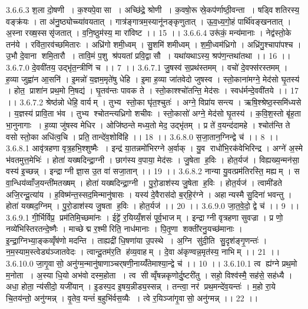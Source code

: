 3.6.6.3
श॒ला दो॒षणी । क॒श्यपे॒वासा । अच्छि॑द्रे॒ श्रोणी । क॒वषो॒रू स्रे॒कप॑र्णाष्ठी॒वन्ता । षड्वि॑शतिरस्य॒ वङ्क्र॑यः । ता अ॑नु॒ष्ठ्योच्च्या॑वयतात् । गात्र॑ङ्गात्रम॒स्यानू॑नङ्कृणुतात् । ऊ॒व॒ध्य॒गो॒हं पार्थि॑वङ्खनतात् । अ॒स्ना रख्ष॒स्ससृ॑जतात् । व॒नि॒ष्ठुम॑स्य॒ मा रा॑विष्ट ।। 15 ।।
3.6.6.4
उरू॑कं॒ मन्य॑मानाः । नेद्व॑स्तो॒के तन॑ये । रवि॑ता॒रव॑च्छमितारः । अध्रि॑गो शमी॒ध्वम् । सु॒शमि॑ शमीध्वम् । श॒मी॒ध्वम॑ध्रिगो । अध्रि॑गु॒श्चापा॑पश्च । उ॒भौ दे॒वाना॑ शमि॒तारौ । तावि॒मं प॒शु श्र॑पयतां प्रवि॒द्वासौ । यथा॑यथाऽस्य॒ श्रप॑ण॒न्तथा॑तथा ।। 16 ।।
3.6.7.0
दे॒ववी॑तय॒ उद्भृ॑त॒न्त्रीणि॑ च ।। 7 ।।
3.6.7.1
जु॒षस्व॑ स॒प्रथ॑स्तमम् । वचो॑ दे॒वफ्स॑रस्तमम् । ह॒व्या जुह्वा॑न आ॒सनि॑ । इ॒मन्नो॑ य॒ज्ञम॒मृते॑षु धेहि । इ॒मा ह॒व्या जा॑तवेदो जुषस्व । स्तो॒काना॑मग्ने॒ मेद॑सो घृ॒तस्य॑ । होत॒ प्राशा॑न प्रथ॒मो नि॒षद्य॑ । घृ॒तव॑न्तः पावक ते । स्तो॒काश्श्चो॑तन्ति॒ मेद॑सः । स्वध॑र्मन्दे॒ववी॑तये ।। 17 ।।
3.6.7.2
श्रेष्ठ॑न्नो धेहि॒ वार्यम् । तुभ्य॑ स्तो॒का घृ॑त॒श्चुतः॑ । अग्ने॒ विप्रा॑य सन्त्य । ऋषि॒श्श्रेष्ठ॒स्समि॑ध्यसे । य॒ज्ञस्य॑ प्रावि॒ता भ॑व । तुभ्य॑ श्चोतन्त्यध्रिगो शचीवः । स्तो॒कासो॑ अग्ने॒ मेद॑सो घृ॒तस्य॑ । क॒वि॒श॒स्तो बृ॑ह॒ता भा॒नुनागाः । ह॒व्या जु॑षस्व मेधिर । ओजि॑ष्ठन्ते मध्य॒तो मेद॒ उद्भृ॑तम् । प्र ते॑ व॒यन्द॑दामहे । श्चोत॑न्ति ते वसो स्तो॒का अधि॑त्व॒चि । प्रति॒ तान्दे॑व॒शोवि॑हि ।। 18 ।।
3.6.8.0
स॒जा॒तान॒ग्निन्द्वे च॑ ।। 8 ।।
3.6.8.1
आवृ॑त्रहणा वृत्र॒हभि॒श्शुष्मैः । इन्द्र॑ या॒तन्नमो॑भिरग्ने अ॒र्वाक् । यु॒व राधो॑भि॒रक॑वेभिरिन्द्र । अग्ने॑ अ॒स्मे भ॑वतमुत्त॒मेभिः॑ । होता॑ यख्षदिन्द्रा॒ग्नी । छाग॑स्य व॒पाया॒ मेद॑सः । जु॒षेता॑ ह॒विः । होत॒र्यज॑ । विह्यख्य॒न्मन॑सा॒ वस्य॑ इ॒च्छन्न् । इन्द्राग्नी ज्ञा॒स उ॒त वा॑ सजा॒तान् ।। 19 ।।
3.6.8.2
नान्या यु॒वत्प्रम॑तिरस्ति॒ मह्यम् । स वा॒न्धिय॑व्वाँज॒यन्ती॑मतख्षम् । होता॑ यख्षदिन्द्रा॒ग्नी । पु॒रो॒डाश॑स्य जु॒षेता॑ ह॒विः । होत॒र्यज॑ । त्वामी॑डते अजि॒रन्दू॒त्या॑य । ह॒विष्म॑न्त॒स्सद॒मिन्मानु॑षासः । यस्य॑ दे॒वैरास॑दो ब॒र्‌हि॒र॑ग्ने । अहान्यस्मै सु॒दिना॑ भवन्तु । होता॑ यख्षद॒ग्निम् । पु॒रो॒डाश॑स्य जु॒षता॑ ह॒विः । होत॒र्यज॑ ।। 20 ।।
3.6.9.0
जा॒त॒वे॒दो॒ द्वे च॑ ।। 9 ।।
3.6.9.1
गी॒र्भिर्विप्र॒ प्रम॑तिमि॒च्छमा॑नः । ईट्टे॑ र॒यिय्यँ॒शसं॑ पूर्व॒भाजम् । इन्द्राग्नी वृत्रहणा सुवज्रा । प्र णो॒ नव्ये॑भिस्तिरतन्दे॒ष्णैः । माच्छेद्म र॒श्मीरिति॒ नाध॑मानाः । पि॒तृ॒णा शक्ती॑रनु॒यच्छ॑मानाः । इ॒न्द्रा॒ग्निभ्या॒ङ्कव्वृँष॑णो मदन्ति । ताह्यद्री॑ धि॒षणा॑या उ॒पस्थे । अ॒ग्नि सु॑दी॒ति सु॒दृश॑ङ्गृ॒णन्तः॑ । न॒म॒स्याम॒स्त्वेड्य॑ञ्जातवेदः । त्वान्दू॒तम॑र॒ति ह॑व्य॒वाहम् । दे॒वा अ॑कृण्वन्न॒मृत॑स्य॒ नाभिम् ।। 21 ।।
3.6.10.0
जा॒गृ॒वासो॒ अनु॑ग्म॒न्मानु॑षाणाञ्चर्‌षणी॒नाय्यँ॑तेमाश्या॒न्द्वे च॑ ।। 10 ।।
3.6.10.1
त्व ह्य॑ग्ने प्रथ॒मो म॒नोता । अ॒स्या धि॒यो अभ॑वो दस्म॒होता । त्व सीव्वृँषन्नकृणोर्दु॒ष्टरी॑तु । सहो॒ विश्व॑स्मै॒ सह॑से॒ सह॑ध्यै । अधा॒ होता॒ न्य॑सीदो॒ यजी॑यान् । इ॒डस्प॒द इ॒षय॒न्नीड्य॒स्सन्न् । तन्त्वा॒ नर॑ प्रथ॒मन्दे॑व॒यन्तः॑ । म॒हो रा॒ये चि॒तय॑न्तो॒ अनु॑ग्मन्न् । वृ॒तेव॒ यन्तं॑ ब॒हुभि॑र्वस॒व्यैः । त्वे र॒यिञ्जा॑गृ॒वासो॒ अनु॑ग्मन्न् ।। 22 ।।
